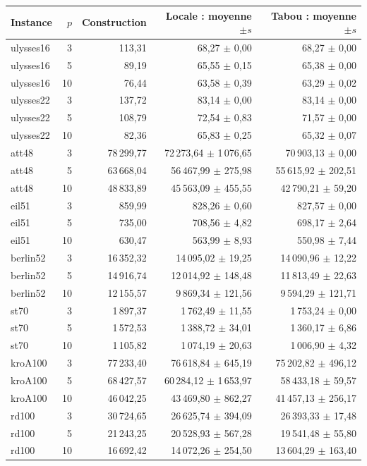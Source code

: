 \begin{tabular}{lrrrr}
\toprule
Instance & $p$ & Construction & Locale : moyenne $\pm s$ & Tabou : moyenne $\pm s$ \\
\midrule
ulysses16 & 3 & 113{,}31 & 68{,}27 $\pm$ 0{,}00 & 68{,}27 $\pm$ 0{,}00 \\
ulysses16 & 5 & 89{,}19 & 65{,}55 $\pm$ 0{,}15 & 65{,}38 $\pm$ 0{,}00 \\
ulysses16 & 10 & 76{,}44 & 63{,}58 $\pm$ 0{,}39 & 63{,}29 $\pm$ 0{,}02 \\
ulysses22 & 3 & 137{,}72 & 83{,}14 $\pm$ 0{,}00 & 83{,}14 $\pm$ 0{,}00 \\
ulysses22 & 5 & 108{,}79 & 72{,}54 $\pm$ 0{,}83 & 71{,}57 $\pm$ 0{,}00 \\
ulysses22 & 10 & 82{,}36 & 65{,}83 $\pm$ 0{,}25 & 65{,}32 $\pm$ 0{,}07 \\
att48 & 3 & 78\,299{,}77 & 72\,273{,}64 $\pm$ 1\,076{,}65 & 70\,903{,}13 $\pm$ 0{,}00 \\
att48 & 5 & 63\,668{,}04 & 56\,467{,}99 $\pm$ 275{,}98 & 55\,615{,}92 $\pm$ 202{,}51 \\
att48 & 10 & 48\,833{,}89 & 45\,563{,}09 $\pm$ 455{,}55 & 42\,790{,}21 $\pm$ 59{,}20 \\
eil51 & 3 & 859{,}99 & 828{,}26 $\pm$ 0{,}60 & 827{,}57 $\pm$ 0{,}00 \\
eil51 & 5 & 735{,}00 & 708{,}56 $\pm$ 4{,}82 & 698{,}17 $\pm$ 2{,}64 \\
eil51 & 10 & 630{,}47 & 563{,}99 $\pm$ 8{,}93 & 550{,}98 $\pm$ 7{,}44 \\
berlin52 & 3 & 16\,352{,}32 & 14\,095{,}02 $\pm$ 19{,}25 & 14\,090{,}96 $\pm$ 12{,}22 \\
berlin52 & 5 & 14\,916{,}74 & 12\,014{,}92 $\pm$ 148{,}48 & 11\,813{,}49 $\pm$ 22{,}63 \\
berlin52 & 10 & 12\,155{,}57 & 9\,869{,}34 $\pm$ 121{,}56 & 9\,594{,}29 $\pm$ 121{,}71 \\
st70 & 3 & 1\,897{,}37 & 1\,762{,}49 $\pm$ 11{,}55 & 1\,753{,}24 $\pm$ 0{,}00 \\
st70 & 5 & 1\,572{,}53 & 1\,388{,}72 $\pm$ 34{,}01 & 1\,360{,}17 $\pm$ 6{,}86 \\
st70 & 10 & 1\,105{,}82 & 1\,074{,}19 $\pm$ 20{,}63 & 1\,006{,}90 $\pm$ 4{,}32 \\
kroA100 & 3 & 77\,233{,}40 & 76\,618{,}84 $\pm$ 645{,}19 & 75\,202{,}82 $\pm$ 496{,}12 \\
kroA100 & 5 & 68\,427{,}57 & 60\,284{,}12 $\pm$ 1\,653{,}97 & 58\,433{,}18 $\pm$ 59{,}57 \\
kroA100 & 10 & 46\,042{,}25 & 43\,469{,}80 $\pm$ 862{,}27 & 41\,457{,}13 $\pm$ 256{,}17 \\
rd100 & 3 & 30\,724{,}65 & 26\,625{,}74 $\pm$ 394{,}09 & 26\,393{,}33 $\pm$ 17{,}48 \\
rd100 & 5 & 21\,243{,}25 & 20\,528{,}93 $\pm$ 567{,}28 & 19\,541{,}48 $\pm$ 55{,}80 \\
rd100 & 10 & 16\,692{,}42 & 14\,072{,}26 $\pm$ 254{,}50 & 13\,604{,}29 $\pm$ 163{,}40 \\
\bottomrule
\end{tabular}
